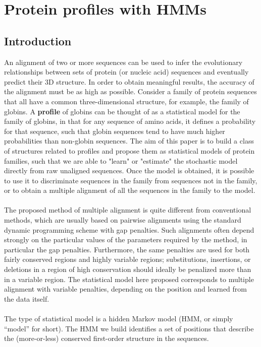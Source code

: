 \graphicspath{{chapters/10/images/}}
\chapter{Protein profiles with HMMs}

\section{Introduction}
An alignment of two or more sequences can be used to infer the evolutionary relationships between sets of protein (or nucleic acid) sequences and eventually predict their 3D structure.
In order to obtain meaningful results, the accuracy of the alignment must be as high as possible.
Consider a family of protein sequences that all have a common three-dimensional structure, for example, the family of globins. A \textbf{profile} of globins can be thought of as a statistical model for the family of globins, in that for any sequence of amino acids, it defines a probability for that sequence, such that globin sequences tend to have much higher probabilities than non-globin sequences.
The aim of this paper is to build a class of structures related to profiles and propose them as statistical models of protein families, such that we are able to "learn" or "estimate" the stochastic model directly from raw unaligned sequences.
Once the model is obtained, it is possible to use it to discriminate sequences in the family from sequences not in the family, or to obtain a multiple alignment of all the sequences in the family to the model.
\\
\\
\noindent
The proposed method of multiple alignment is quite different from conventional methods, which are usually based on pairwise alignments using the standard dynamic programming scheme with gap penalties.
Such alignments often depend strongly on the particular values of the parameters required by the method, in particular the gap penalties. Furthermore, the same penalties are used for both fairly conserved regions and highly variable regions; substitutions, insertions, or deletions in a region of high conservation should ideally be penalized more than in a variable region.  The statistical model here proposed corresponds to multiple alignment with variable penalties, depending on the position and learned from the data itself.
\\
\\
\noindent
The type of statistical model is a hidden Markov model (HMM, or simply “model” for short). The HMM we build identifies a set of positions that describe the (more-or-less) conserved first-order structure in the sequences.
